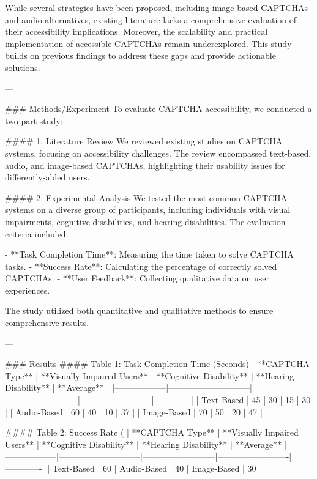 While several strategies have been proposed, including image-based CAPTCHAs and audio alternatives, existing literature lacks a comprehensive evaluation of their accessibility implications. Moreover, the scalability and practical implementation of accessible CAPTCHAs remain underexplored. This study builds on previous findings to address these gaps and provide actionable solutions.

---

### Methods/Experiment  
To evaluate CAPTCHA accessibility, we conducted a two-part study:

#### 1. Literature Review  
We reviewed existing studies on CAPTCHA systems, focusing on accessibility challenges. The review encompassed text-based, audio, and image-based CAPTCHAs, highlighting their usability issues for differently-abled users.

#### 2. Experimental Analysis  
We tested the most common CAPTCHA systems on a diverse group of participants, including individuals with visual impairments, cognitive disabilities, and hearing disabilities. The evaluation criteria included:

- **Task Completion Time**: Measuring the time taken to solve CAPTCHA tasks.
- **Success Rate**: Calculating the percentage of correctly solved CAPTCHAs.
- **User Feedback**: Collecting qualitative data on user experiences.

The study utilized both quantitative and qualitative methods to ensure comprehensive results.

---

### Results  
#### Table 1: Task Completion Time (Seconds)  
| **CAPTCHA Type** | **Visually Impaired Users** | **Cognitive Disability** | **Hearing Disability** | **Average** |  
|------------------|-----------------------------|--------------------------|-------------------------|-------------|  
| Text-Based       | 45                         | 30                       | 15                     | 30          |  
| Audio-Based      | 60                         | 40                       | 10                     | 37          |  
| Image-Based      | 70                         | 50                       | 20                     | 47          |  

#### Table 2: Success Rate (%
| **CAPTCHA Type** | **Visually Impaired Users** | **Cognitive Disability** | **Hearing Disability** | **Average** |  
|------------------|-----------------------------|--------------------------|-------------------------|-------------|  
| Text-Based       | 60%
| Audio-Based      | 40%
| Image-Based      | 30%

